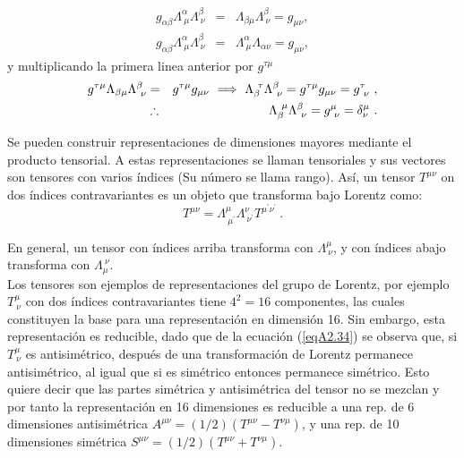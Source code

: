 \begin{eqnarray*}
g_{\alpha \beta }\Lambda _{~\mu }^{\alpha }\Lambda _{~\nu }^{\beta }
&=&\Lambda _{\beta \mu }\Lambda _{~\nu }^{\beta }=g_{\mu \nu }, \\
g_{\alpha \beta }\Lambda _{~\mu }^{\alpha }\Lambda _{~\nu }^{\beta }
&=&\Lambda _{~\mu }^{\alpha }\Lambda _{\alpha \nu }=g_{\mu \nu },
\end{eqnarray*}%
y multiplicando la primera linea anterior por $g^{\tau \mu }$%
\begin{eqnarray}
g^{\tau \mu }\Lambda _{\beta \mu }\Lambda _{~\nu }^{\beta } &=&g^{\tau \mu
}g_{\mu \nu }~\Longrightarrow ~\Lambda _{\beta }^{~\tau }\Lambda _{~\nu
}^{\beta }=g^{\tau \mu }g_{\mu \nu }=g_{~\nu }^{\tau }~,  \notag \\
&\therefore &~\Lambda _{\beta }^{~\mu }\Lambda _{~\nu }^{\beta }=g_{~\nu
}^{\mu }=\delta _{\nu }^{\mu }~.
\end{eqnarray}
 
Se pueden construir representaciones de dimensiones mayores mediante el producto tensorial. A estas representaciones se llaman tensoriales y sus vectores son tensores con varios índices (Su número se llama rango). Así, un tensor $T^{\mu \nu}$ on dos índices contravariantes es un objeto que transforma bajo Lorentz como:
\begin{equation}
    T^{\mu \nu} = \Lambda^{\mu}_{~\mu^{\prime}} \Lambda^{\nu}_{~\nu^{\prime}} T^{\mu^{\prime} \nu^{\prime}}~.
\label{eqA2.34}
\end{equation}

En general, un tensor con índices arriba transforma con $\Lambda^{\mu}_{~\nu}$, y con índices abajo transforma con $\Lambda_{\mu}^{~\nu}$.\\

Los tensores son ejemplos de representaciones del grupo de Lorentz, por ejemplo $T^{\mu}_{~\nu}$ con dos índices contravariantes tiene $4^{2}=16$ componentes, las cuales constituyen la base para una representación en dimensión 16. Sin embargo, esta representación es reducible, dado que de la ecuación (\ref{eqA2.34}) se observa que, si $T^{\mu}_{~\nu}$ es antisimétrico, después de una transformación de Lorentz permanece antisimétrico, al igual que si es simétrico entonces permanece simétrico. Esto quiere decir que las partes simétrica y antisimétrica del tensor no se mezclan y por tanto la representación en 16 dimensiones es reducible a una rep. de 6 dimensiones antisimétrica $A^{\mu \nu}=(1/2)(T^{\mu \nu}-T^{\nu \mu})$, y una rep. de 10 dimensiones simétrica $S^{\mu \nu}=(1/2)(T^{\mu \nu}+T^{\nu \mu})$.

